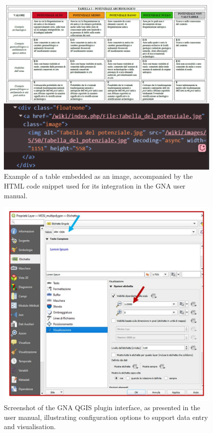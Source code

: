 \begin{spacing}{1.5}
\begin{figure}[H]
  \centering
  \includegraphics[width=\textwidth]{images/merged.jpg} 
  \caption{Example of a table embedded as an image, accompanied by the HTML code
snippet used for its integration in the GNA user manual.}
  \label{fig:example_image}
\end{figure}

\begin{figure}[H]
  \centering
  \includegraphics[width=\textwidth]{images/esempio_screen.png} 
  \caption{Screenshot of the GNA QGIS plugin interface, as presented in the user manual, illustrating configuration options to support data entry and visualisation.}
  \label{fig:screen_image}
\end{figure}


\end{spacing}
